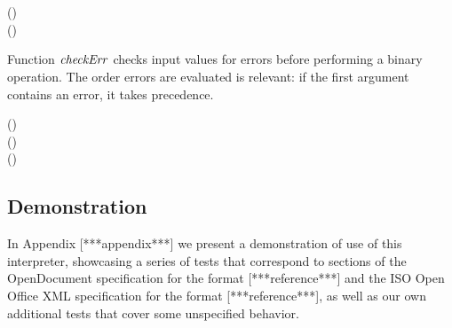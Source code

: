 \begin{hscode}
\\
\>[28]{}\<[30]%
\>[30]{}\anonymous {}\<[38]%
\>[38]{}\to {}\;\<[E]%
\\
\>[4]{}\<[7]%
\>[7]{}\;(){}\<[28]%
\>[28]{}\mathrel{=}\;\<[E]%
\\
\>[4]{}\<[7]%
\>[7]{}\;(\;\anonymous ){}\<[28]%
\>[28]{}\mathrel{=}\;\<[E]%
\\
\>[4]{}\<[7]%
\>[7]{}\;\<[28]%
\>[28]{}\mathrel{=}\<[E]%
\ColumnHook
\end{hscode}\resethooks

Function \ensuremath{\Varid{checkErr}} checks input values for errors before performing
a binary operation. The order errors are evaluated is relevant: if
the first argument contains an error, it takes precedence.

\begin{hscode}\SaveRestoreHook
{}%
%
%
%
\>[B]{}\mathbin{::}(\to {}\to {})\to {}\to {}\to {}\<[E]%
\\
\>[B]{}\;\;(\;\anonymous )\;{}\<[28]%
\>[28]{}\anonymous {}\<[43]%
\>[43]{}\mathrel{=}\<[E]%
\\
\>[B]{}\;\;\anonymous \;{}\<[28]%
\>[28]{}(\;\anonymous ){}\<[43]%
\>[43]{}\mathrel{=}\<[E]%
\\
\>[B]{}\;\;\;{}\<[28]%
\>[28]{}\<[43]%
\>[43]{}\mathrel{=}\;\;\<[E]%
\ColumnHook
\end{hscode}\resethooks

\subsection{Demonstration}

In Appendix [***appendix***] we present a demonstration of use of this
interpreter, showcasing a series of tests that correspond to sections of the
OpenDocument specification for the  format [***reference***] and the ISO
Open Office XML specification for the  format [***reference***], as
well as our own additional tests that cover some unspecified behavior.


